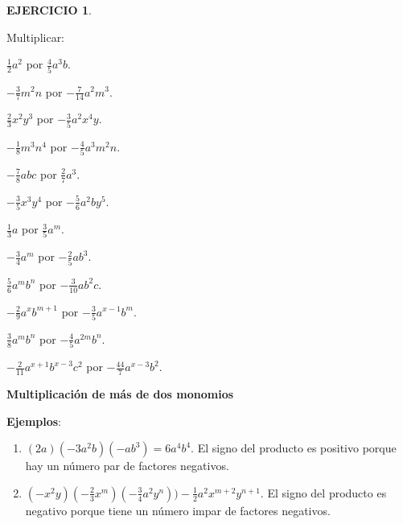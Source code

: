 \documentclass[12pt,letterpaper]{article}
\theoremstyle{definition}
\newtheorem{ejer}{EJERCICIO}
\begin{document}
\begin{ejer}\

Multiplicar: %
\begin{enumerate}
\begin{multicols}{2}
\item $\frac{1}{2}a^2$ por $\frac{4}{5}a^3b$.
\item $-\frac{3}{7}m^2n$ por $-\frac{7}{14}a^2m^3$.
\item $\frac{2}{3}x^2y^3$ por $-\frac{3}{5}a^2x^4y$.
\item $-\frac{1}{8}m^3n^4$ por $-\frac{4}{5}a^3m^2n$.
\item $-\frac{7}{8}abc$ por $\frac{2}{7}a^3$.
\item $-\frac{3}{5}x^3y^4$ por $-\frac{5}{6}a^2by^5$.
\item $\frac{1}{3}a$ por $\frac{3}{5}a^m$.
\item $-\frac{3}{4}a^m$ por $-\frac{2}{5}ab^3$.
\item $\frac{5}{6}a^mb^n$ por $-\frac{3}{10}ab^2c$.
\item $-\frac{2}{9}a^xb^{m+1}$ por $-\frac{3}{5}a^{x-1}b^m$.
\item $\frac{3}{8}a^mb^n$ por $-\frac{4}{5}a^{2m}b^n$.
\item $-\frac{2}{11}a^{x+1}b^{x-3}c^2$ por $-\frac{44}{7}a^{x-3}b^2$.
\end{multicols}
\end{enumerate}
\end{ejer}

\vspace{1mm}

\textbf{Multiplicación de más de dos monomios}

\textbf{Ejemplos}:
\begin{enumerate}
\item $(2a)(-3a^2b)(-ab^3)=6a^4b^4$. El signo del producto es positivo porque hay un número par de factores negativos.
\item $\left(-x^2y\right)\left(-\frac{2}{3}x^m\right)\left(-\frac{3}{4}a^2y^n\right))-\frac{1}{2}a^2x^{m+2}y^{n+1}$. El signo del producto es negativo porque tiene un número impar de factores negativos.
\end{enumerate}

\vspace{1mm}
\end{document}
